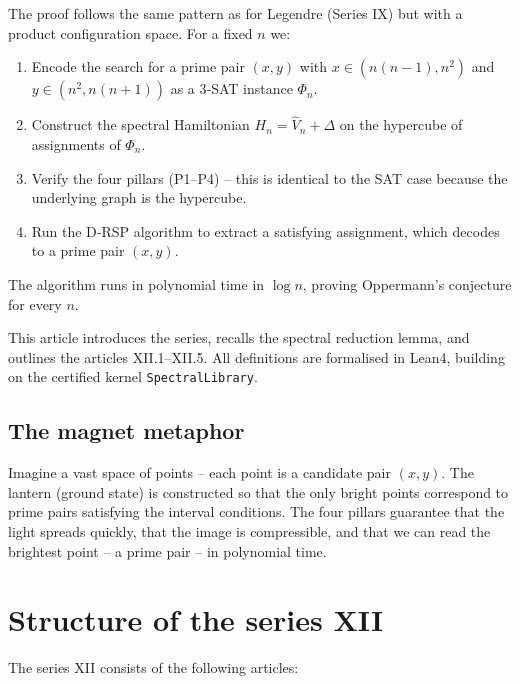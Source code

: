 \documentclass[11pt,a4paper]{article}
\begin{document}
The proof follows the same pattern as for Legendre (Series IX) but with a product configuration space. For a fixed $n$ we:
\begin{enumerate}
\item Encode the search for a prime pair $(x,y)$ with $x\in (n(n-1), n^2)$ and $y\in (n^2, n(n+1))$ as a 3‑SAT instance $\Phi_n$.
\item Construct the spectral Hamiltonian $H_n = \hat{V}_n + \Delta$ on the hypercube of assignments of $\Phi_n$.
\item Verify the four pillars (P1–P4) – this is identical to the SAT case because the underlying graph is the hypercube.
\item Run the D‑RSP algorithm to extract a satisfying assignment, which decodes to a prime pair $(x,y)$.
\end{enumerate}
The algorithm runs in polynomial time in $\log n$, proving Oppermann's conjecture for every $n$.

This article introduces the series, recalls the spectral reduction lemma, and outlines the articles XII.1–XII.5. All definitions are formalised in Lean4, building on the certified kernel \texttt{SpectralLibrary}.

\subsection{The magnet metaphor}

Imagine a vast space of points – each point is a candidate pair $(x,y)$. The lantern (ground state) is constructed so that the only bright points correspond to prime pairs satisfying the interval conditions. The four pillars guarantee that the light spreads quickly, that the image is compressible, and that we can read the brightest point – a prime pair – in polynomial time.

\section{Structure of the series XII}

The series XII consists of the following articles:
\end{document}
